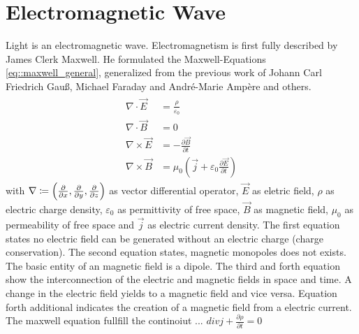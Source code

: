\section{Electromagnetic Wave}
% 
Light is an electromagnetic wave. Electromagnetism is first fully described by James Clerk Maxwell. He formulated the Maxwell-Equations \cref{eq::maxwell_general}, generalized from the previous work of Johann Carl Friedrich Gau{\ss}, Michael Faraday and Andr\'{e}-Marie Amp\`{e}re and others. 
% 
% 
\begin{align} 
\begin{split} \label{eq::maxwell_general}
    \nabla \cdot \vec{E} &= \frac {\rho} {\varepsilon_0}\\
    \nabla \cdot \vec{B} &= 0\\
    \nabla \times \vec{E} &= -\frac{\partial \vec{B}} {\partial t}\\
    \nabla \times \vec{B} &= \mu_0\left(\vec{j} + \varepsilon_0 \frac{\partial \vec{E}} {\partial t} \right)
\end{split}
\end{align}
% 
with $\nabla \coloneqq \left({\partial \over \partial x}, {\partial \over \partial y}, {\partial \over \partial z} \right)$ as vector differential operator, $\vec{E}$ as eletric field, $\rho$ as electric charge density, $\varepsilon_0$ as permittivity of free space, $\vec{B}$ as magnetic field, $\mu_0$ as permeability of free space and $\vec{j}$ as electric current density. 
% 
The first equation states no electric field can be generated without an electric charge (charge conservation).
The second equation states, magnetic monopoles does not exists. The basic entity of an magnetic field is a dipole.
The third and forth equation show the interconnection of the electric and magnetic fields in space and time. A change in the electric field yields to a magnetic field and vice versa. Equation forth additional indicates the creation of a magnetic field from a electric current. The maxwell equation fullfill the continoiut ... $div j + \frac{\partial \rho}{\partial t} = 0$
